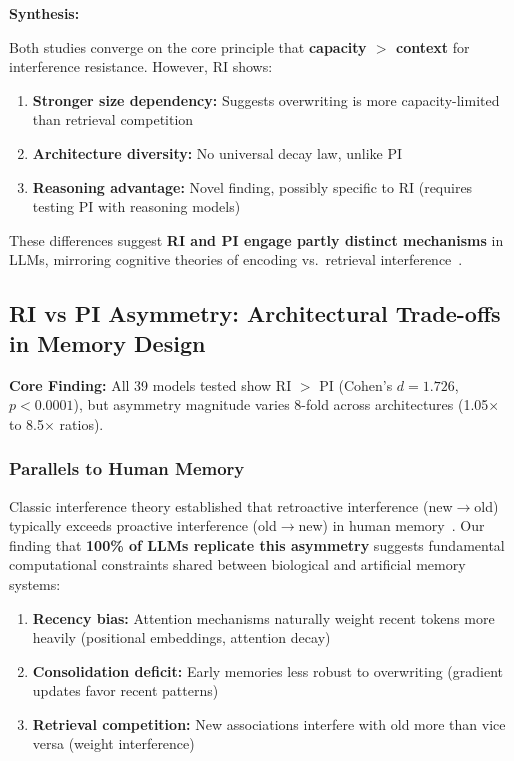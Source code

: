\documentclass{article}
\begin{document}
\textbf{Synthesis:}

Both studies converge on the core principle that \textbf{capacity $>$ context} for interference resistance. However, RI shows:
\begin{enumerate}
    \item \textbf{Stronger size dependency:} Suggests overwriting is more capacity-limited than retrieval competition
    \item \textbf{Architecture diversity:} No universal decay law, unlike PI
    \item \textbf{Reasoning advantage:} Novel finding, possibly specific to RI (requires testing PI with reasoning models)
\end{enumerate}

These differences suggest \textbf{RI and PI engage partly distinct mechanisms} in LLMs, mirroring cognitive theories of encoding vs.\ retrieval interference~\citep{underwood1957interference, wixted2004consolidation}.

\subsection{RI vs PI Asymmetry: Architectural Trade-offs in Memory Design}

\textbf{Core Finding:} All 39 models tested show RI $>$ PI (Cohen's $d = 1.726$, $p < 0.0001$), but asymmetry magnitude varies 8-fold across architectures (1.05$\times$ to 8.5$\times$ ratios).

\subsubsection{Parallels to Human Memory}

Classic interference theory established that retroactive interference (new$\rightarrow$old) typically exceeds proactive interference (old$\rightarrow$new) in human memory~\citep{jenkins1924obliviscence, underwood1957interference}. Our finding that \textbf{100\% of LLMs replicate this asymmetry} suggests fundamental computational constraints shared between biological and artificial memory systems:

\begin{enumerate}
    \item \textbf{Recency bias:} Attention mechanisms naturally weight recent tokens more heavily (positional embeddings, attention decay)
    \item \textbf{Consolidation deficit:} Early memories less robust to overwriting (gradient updates favor recent patterns)
    \item \textbf{Retrieval competition:} New associations interfere with old more than vice versa (weight interference)
\end{enumerate}
\end{document}
